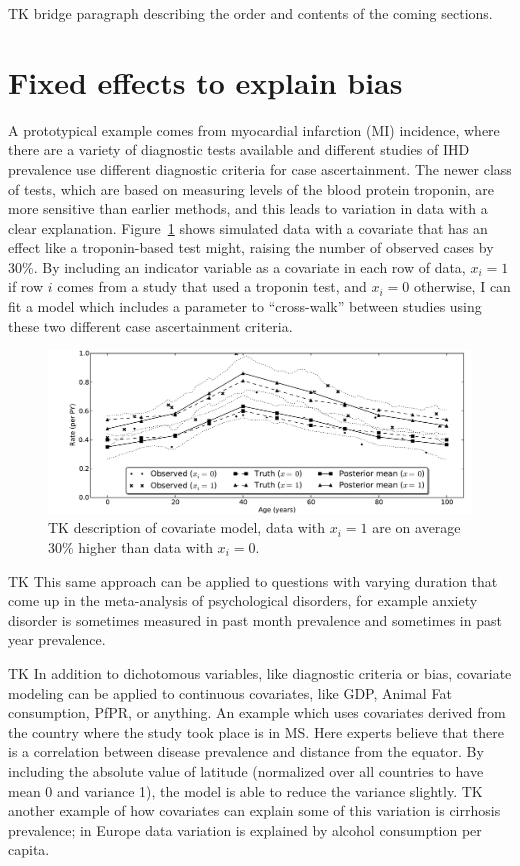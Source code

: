 TK bridge paragraph describing the order and contents of the coming
sections.
\section{Fixed effects to explain bias}

A prototypical example comes from myocardial infarction (MI)
incidence, where there are a variety of diagnostic tests available and
different studies of IHD prevalence use different diagnostic criteria
for case ascertainment.  The newer class of tests, which are based on
measuring levels of the blood protein troponin, are more sensitive
than earlier methods, and this leads to variation in data with a clear
explanation.  Figure~\ref{cov-sim} shows simulated data with a
covariate that has an effect like a troponin-based test might, raising
the number of observed cases by 30\%. By including an indicator
variable as a covariate in each row of data, $x_i = 1$ if row $i$
comes from a study that used a troponin test, and $x_i = 0$ otherwise,
I can fit a model which includes a parameter to ``cross-walk'' between
studies using these two different case ascertainment criteria.

\begin{figure}[h]
\begin{center}
\includegraphics[width=\textwidth]{cov_fe.pdf}
\caption{TK description of covariate model, data with $x_i=1$ are on average 30\% higher than data with $x_i=0$.}
\label{cov-sim}
\end{center}
\end{figure}

TK This same approach can be applied to questions with varying
duration that come up in the meta-analysis of psychological disorders,
for example anxiety disorder is sometimes measured in past month
prevalence and sometimes in past year prevalence.

TK In addition to dichotomous variables, like diagnostic criteria or
bias, covariate modeling can be applied to continuous covariates, like
GDP, Animal Fat consumption, PfPR, or anything.  An example which uses
covariates derived from the country where the study took place is in
MS.  Here experts believe that there is a correlation between disease
prevalence and distance from the equator.  By including the absolute
value of latitude (normalized over all countries to have mean 0 and
variance 1), the model is able to reduce the variance slightly. TK
another example of how covariates can explain some of this variation
is cirrhosis prevalence; in Europe data variation is explained by
alcohol consumption per capita.


